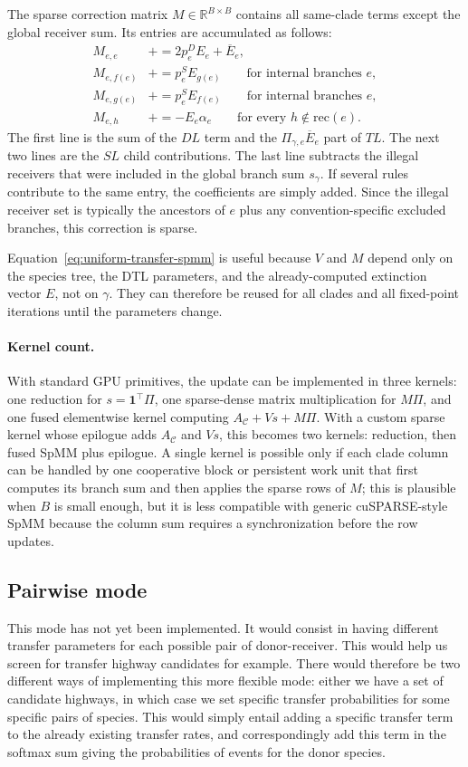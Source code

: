 \documentclass{article}
\newcommand{\1}{\mathbf{1}}
\newcommand{\Rbb}{\mathbb{R}}
\newcommand{\Ebar}{\overline{E}}
\newcommand{\rec}{\mathrm{rec}}
\begin{document}
The sparse correction matrix $M\in\Rbb^{B\times B}$ contains all same-clade terms except the global receiver sum. Its entries are accumulated as follows:
\begin{align*}
    M_{e,e} &\mathrel{+}= 2p^D_eE_e+\Ebar_e, \\
    M_{e,f(e)} &\mathrel{+}= p^S_eE_{g(e)}
        \qquad\text{for internal branches }e,\\
    M_{e,g(e)} &\mathrel{+}= p^S_eE_{f(e)}
        \qquad\text{for internal branches }e,\\
    M_{e,h} &\mathrel{+}= -E_e\alpha_e
        \qquad\text{for every }h\notin\rec(e).
\end{align*}
The first line is the sum of the $DL$ term and the $\Pi_{\gamma,e}\Ebar_e$ part of $TL$. The next two lines are the $SL$ child contributions. The last line subtracts the illegal receivers that were included in the global branch sum $s_\gamma$. If several rules contribute to the same entry, the coefficients are simply added. Since the illegal receiver set is typically the ancestors of $e$ plus any convention-specific excluded branches, this correction is sparse.

Equation~\eqref{eq:uniform-transfer-spmm} is useful because $V$ and $M$ depend only on the species tree, the DTL parameters, and the already-computed extinction vector $E$, not on $\gamma$. They can therefore be reused for all clades and all fixed-point iterations until the parameters change.

\paragraph{Kernel count.}
With standard GPU primitives, the update can be implemented in three kernels: one reduction for $s=\mathbf{1}^\top\Pi$, one sparse-dense matrix multiplication for $M\Pi$, and one fused elementwise kernel computing $A_{\mathcal{C}}+Vs+M\Pi$. With a custom sparse kernel whose epilogue adds $A_{\mathcal{C}}$ and $Vs$, this becomes two kernels: reduction, then fused SpMM plus epilogue. A single kernel is possible only if each clade column can be handled by one cooperative block or persistent work unit that first computes its branch sum and then applies the sparse rows of $M$; this is plausible when $B$ is small enough, but it is less compatible with generic cuSPARSE-style SpMM because the column sum requires a synchronization before the row updates.
\subsection{Pairwise mode}
This mode has not yet been implemented. It would consist in having different transfer parameters for each possible pair of donor-receiver. This would help us screen for transfer highway candidates for example. There would therefore be two different ways of implementing this more flexible mode: either we have a set of candidate highways, in which case we set specific transfer probabilities for some specific pairs of species. This would simply entail adding a specific transfer term to the already existing transfer rates, and correspondingly add this term in the softmax sum giving the probabilities of events for the donor species.
\end{document}
